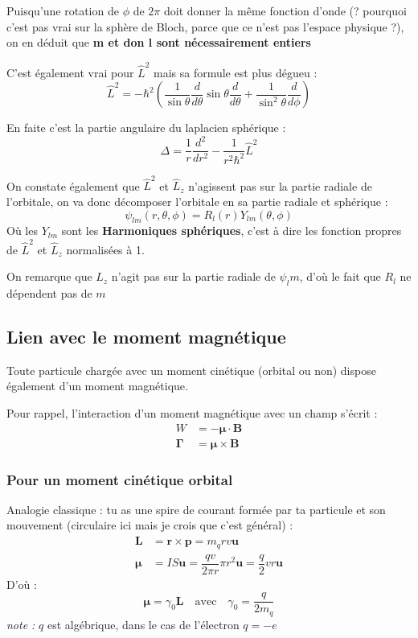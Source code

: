 \documentclass[a4paper]{report}
\begin{document}
Puisqu'une rotation de $\phi$ de $2\pi$ doit donner la même fonction d'onde (? pourquoi c'est pas vrai sur la sphère de Bloch, parce que ce n'est pas l'espace physique ?), on en déduit que \textbf{m et don l sont nécessairement entiers}

C'est également vrai pour $\hat L^2$ mais sa formule est plus dégueu : \begin{equation}
\hat L^2= -\hbar ^2 \left( \dfrac{1}{\sin \theta}\dfrac{d}{d\theta}\sin \theta\dfrac{d}{d\theta}+ \dfrac{1}{\sin ^2 \theta} \dfrac{d}{d\phi} \right)
\end{equation}

En faite c'est la partie angulaire du laplacien sphérique : \begin{equation}
\Delta = \dfrac{1}{r}\dfrac{d^2}{dr^2}-\dfrac{1}{r^2\hbar^2}\hat L^2
\end{equation}

On constate également que $\hat L^2$ et $\hat L_z$ n'agissent pas sur la partie radiale de l'orbitale, on va donc décomposer l'orbitale en sa partie radiale et sphérique : \begin{equation}
\psi_{lm}(r,\theta,\phi)=R_{l}(r)Y_{lm}(\theta,\phi)
\end{equation}
Où les $Y_{lm}$ sont les \textbf{Harmoniques sphériques}, c'est à dire les fonction propres de $\hat L^2$ et $\hat L_z$ normalisées à 1.

On remarque que $L_z$ n'agit pas sur la partie radiale de $\psi_lm$, d'où le fait que $R_{l}$ ne dépendent pas de $m$

\subsection{Lien avec le moment magnétique}
Toute particule chargée avec un moment cinétique (orbital ou non) dispose également d'un moment magnétique.

Pour rappel, l'interaction d'un moment magnétique avec un champ s'écrit : \begin{align}
W &= - \bm \mu \cdot \bm B \\
\bm \Gamma &= \bm \mu \times \bm B
\end{align}
\subsubsection{Pour un moment cinétique orbital}
Analogie classique : tu as une spire de courant formée par ta particule et son mouvement (circulaire ici mais je crois que c'est général) :
\begin{align}
\bm L &= \bm r \times \bm p = m_q r v \bm u \\
\bm \mu &= I S \bm u = \dfrac{qv}{2\pi r}\pi r^2 \bm u = \dfrac{q}{2} v r \bm u
\end{align}
D'où : \begin{equation}
\bm \mu = \gamma_0 \bm L \quad \mathrm{avec} \quad \gamma_0=\dfrac{q}{2 m_q}
\end{equation}
\emph{note :} $q$ est algébrique, dans le cas de l'électron $q=-e$
\end{document}
